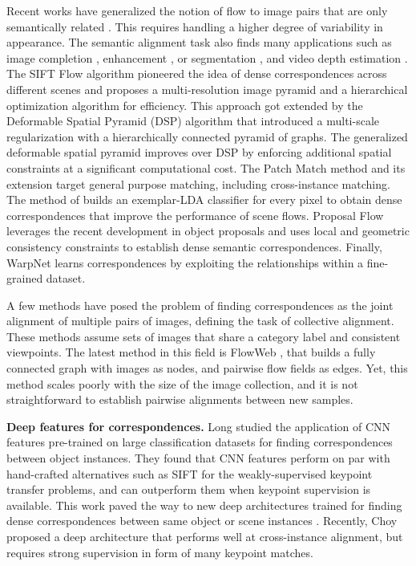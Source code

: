 \documentclass[10pt,twocolumn,letterpaper]{article}
\newcommand{\myparagraph}[1]{\vspace{0.15cm}\noindent\textbf{#1.}}
\begin{document}
Recent works have generalized the notion of flow to image pairs that are only semantically related \cite{liu11siftflow,qui14scale,kim2013deformable,tau15dense,ham2016}. This requires handling a higher degree of variability in appearance. 
The semantic alignment task also finds many applications such as image completion \cite{barnes10patchmatch}, enhancement \cite{hacohen2011non}, or segmentation \cite{liu11siftflow}, and video depth estimation \cite{karsch2012depth}.
%
The SIFT Flow algorithm \cite{liu08siftflow,liu11siftflow} pioneered the idea of dense correspondences across different scenes and proposes a multi-resolution image pyramid and a hierarchical optimization algorithm for efficiency. This approach got extended by the Deformable Spatial Pyramid (DSP) algorithm \cite{kim2013deformable} that introduced a multi-scale regularization with a hierarchically connected pyramid of graphs. The generalized deformable spatial pyramid \cite{hur15generalized} improves over DSP by enforcing additional spatial constraints at a significant computational cost. 
The Patch Match method \cite{barnes09patchmatch} and its extension \cite{barnes10patchmatch} target general purpose matching, including cross-instance matching.
The method of \cite{bristow2015dense} builds an exemplar-LDA classifier for every pixel to obtain dense correspondences that improve the performance of scene flows.
Proposal Flow \cite{ham2016} leverages the recent development in object proposals and uses local and geometric consistency constraints to establish dense semantic correspondences.
Finally, WarpNet \cite{kanazawa16warpnet} learns correspondences by exploiting the relationships within a fine-grained dataset. 

A few methods \cite{huang07unsupervised,huang12learning,peng2010rasl,kemelmacher2012collection,mobahi14a,zhou15flowweb} have posed the problem of finding correspondences as the joint alignment of multiple pairs of images, defining the task of collective alignment. These methods assume sets of 
images that share a category label and consistent viewpoints. 
The latest method in this field is FlowWeb \cite{zhou15flowweb}, that builds a fully connected graph with images as nodes, and pairwise flow fields as edges. Yet, this method scales poorly with the size of the image collection, and
it is not straightforward to establish pairwise alignments between new samples.

\myparagraph{Deep features for correspondences}
Long \etal\cite{long2014do} studied the application of CNN features pre-trained on large classification datasets for finding correspondences between object instances. 
They found that CNN features perform on par with hand-crafted alternatives such as SIFT for the weakly-supervised keypoint transfer problems, and can outperform them when keypoint supervision is available. 
This work paved the way to new deep architectures trained for finding dense correspondences between same object or scene instances \cite{dosovitskiy14flownet,zbontar16stereo,thewlis16fully-trainable}. 
Recently, Choy \etal\cite{choy16universal} proposed a deep architecture that performs well at cross-instance alignment, but requires 
strong supervision in form of many keypoint matches.
\end{document}
